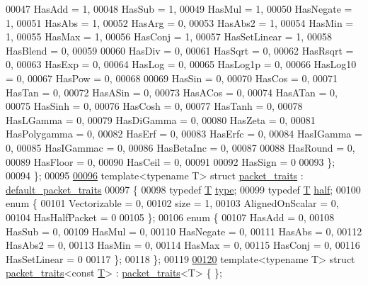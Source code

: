 \begin{DoxyCode}
00047     HasAdd    = 1,
00048     HasSub    = 1,
00049     HasMul    = 1,
00050     HasNegate = 1,
00051     HasAbs    = 1,
00052     HasArg    = 0,
00053     HasAbs2   = 1,
00054     HasMin    = 1,
00055     HasMax    = 1,
00056     HasConj   = 1,
00057     HasSetLinear = 1,
00058     HasBlend  = 0,
00059 
00060     HasDiv    = 0,
00061     HasSqrt   = 0,
00062     HasRsqrt  = 0,
00063     HasExp    = 0,
00064     HasLog    = 0,
00065     HasLog1p  = 0,
00066     HasLog10  = 0,
00067     HasPow    = 0,
00068 
00069     HasSin    = 0,
00070     HasCos    = 0,
00071     HasTan    = 0,
00072     HasASin   = 0,
00073     HasACos   = 0,
00074     HasATan   = 0,
00075     HasSinh   = 0,
00076     HasCosh   = 0,
00077     HasTanh   = 0,
00078     HasLGamma = 0,
00079     HasDiGamma = 0,
00080     HasZeta = 0,
00081     HasPolygamma = 0,
00082     HasErf = 0,
00083     HasErfc = 0,
00084     HasIGamma = 0,
00085     HasIGammac = 0,
00086     HasBetaInc = 0,
00087 
00088     HasRound  = 0,
00089     HasFloor  = 0,
00090     HasCeil   = 0,
00091 
00092     HasSign   = 0
00093   \};
00094 \};
00095 
\hyperlink{struct_eigen_1_1internal_1_1packet__traits}{00096} \textcolor{keyword}{template}<\textcolor{keyword}{typename} T> \textcolor{keyword}{struct }\hyperlink{struct_eigen_1_1internal_1_1packet__traits}{packet\_traits} : \hyperlink{struct_eigen_1_1internal_1_1default__packet__traits}{default\_packet\_traits}
00097 \{
00098   \textcolor{keyword}{typedef} \hyperlink{group___sparse_core___module}{T} \hyperlink{group___sparse_core___module}{type};
00099   \textcolor{keyword}{typedef} \hyperlink{group___sparse_core___module}{T} \hyperlink{group___sparse_core___module}{half};
00100   \textcolor{keyword}{enum} \{
00101     Vectorizable = 0,
00102     size = 1,
00103     AlignedOnScalar = 0,
00104     HasHalfPacket = 0
00105   \};
00106   \textcolor{keyword}{enum} \{
00107     HasAdd    = 0,
00108     HasSub    = 0,
00109     HasMul    = 0,
00110     HasNegate = 0,
00111     HasAbs    = 0,
00112     HasAbs2   = 0,
00113     HasMin    = 0,
00114     HasMax    = 0,
00115     HasConj   = 0,
00116     HasSetLinear = 0
00117   \};
00118 \};
00119 
\hyperlink{struct_eigen_1_1internal_1_1packet__traits_3_01const_01_t_01_4}{00120} \textcolor{keyword}{template}<\textcolor{keyword}{typename} T> \textcolor{keyword}{struct }\hyperlink{struct_eigen_1_1internal_1_1packet__traits}{packet\_traits}<const \hyperlink{group___sparse_core___module}{T}> : \hyperlink{struct_eigen_1_1internal_1_1packet__traits}{packet\_traits}<T> \{ \};

\end{DoxyCode}
